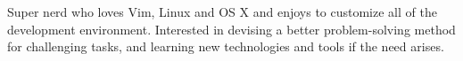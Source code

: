 

\begin{cvparagraph}

Super nerd who loves Vim, Linux and OS X and enjoys to customize all of the development environment. Interested in devising a better problem-solving method for challenging tasks, and learning new technologies and tools if the need arises.
\end{cvparagraph}
